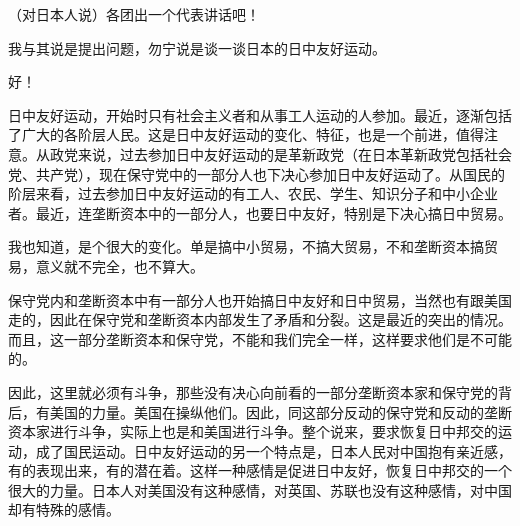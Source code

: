（对日本人说）各团出一个代表讲话吧！

我与其说是提出问题，勿宁说是谈一谈日本的日中友好运动。

好！

日中友好运动，开始时只有社会主义者和从事工人运动的人参加。最近，逐渐包括了广大的各阶层人民。这是日中友好运动的变化、特征，也是一个前进，值得注意。从政党来说，过去参加日中友好运动的是革新政党（在日本革新政党包括社会党、共产党），现在保守党中的一部分人也下决心参加日中友好运动了。从国民的阶层来看，过去参加日中友好运动的有工人、农民、学生、知识分子和中小企业者。最近，连垄断资本中的一部分人，也要日中友好，特别是下决心搞日中贸易。

我也知道，是个很大的变化。单是搞中小贸易，不搞大贸易，不和垄断资本搞贸易，意义就不完全，也不算大。

保守党内和垄断资本中有一部分人也开始搞日中友好和日中贸易，当然也有跟美国走的，因此在保守党和垄断资本内部发生了矛盾和分裂。这是最近的突出的情况。而且，这一部分垄断资本和保守党，不能和我们完全一样，这样要求他们是不可能的。

因此，这里就必须有斗争，那些没有决心向前看的一部分垄断资本家和保守党的背后，有美国的力量。美国在操纵他们。因此，同这部分反动的保守党和反动的垄断资本家进行斗争，实际上也是和美国进行斗争。整个说来，要求恢复日中邦交的运动，成了国民运动。日中友好运动的另一个特点是，日本人民对中国抱有亲近感，有的表现出来，有的潜在着。这样一种感情是促进日中友好，恢复日中邦交的一个很大的力量。日本人对美国没有这种感情，对英国、苏联也没有这种感情，对中国却有特殊的感情。

